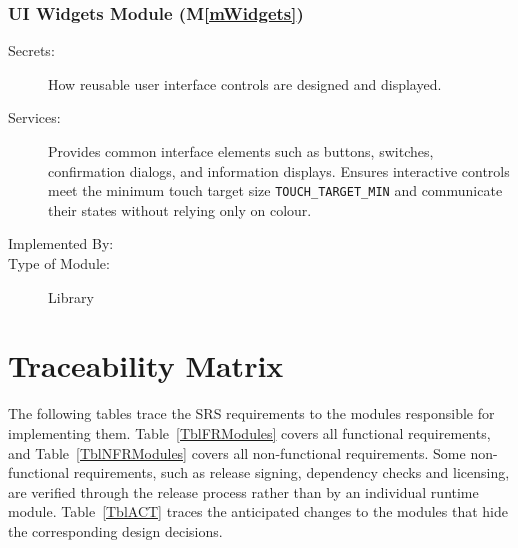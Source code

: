 \documentclass[10pt, titlepage]{article}
\newcommand{\mplainref}[1]{M\ref*{#1}}
\begin{document}
\subsubsection{UI Widgets Module (\mplainref{mWidgets})}\label{md:mWidgets}

\begin{description}
\item[Secrets:] How reusable user interface controls
  are designed and displayed.
\item[Services:] Provides common interface elements
  such as buttons, switches, confirmation dialogs,
  and information displays. Ensures interactive
  controls meet the minimum touch target size
  \texttt{TOUCH\_TARGET\_MIN} and communicate
  their states without relying only on colour.
\item[Implemented By:] \progname{}
\item[Type of Module:] Library
\end{description}

\newpage
\section{Traceability Matrix} \label{SecTM}

The following tables trace the SRS requirements to the modules responsible for
implementing them. Table~\ref{TblFRModules} covers all functional requirements,
and Table~\ref{TblNFRModules} covers all non-functional requirements. Some
non-functional requirements, such as release signing, dependency checks and
licensing, are verified through the release process rather than by an
individual runtime module. Table~\ref{TblACT} traces the anticipated changes to the modules that hide
the corresponding design decisions.

\setlength{\LTcapwidth}{\textwidth}
\end{document}
